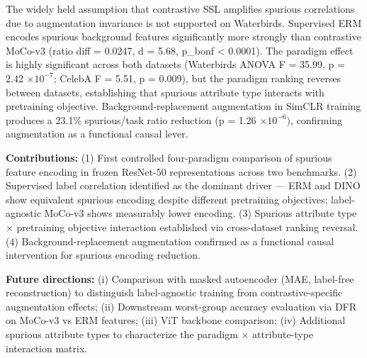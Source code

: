
The widely held assumption that contrastive SSL amplifies spurious correlations due to augmentation invariance is not supported on Waterbirds. Supervised ERM encodes spurious background features significantly more strongly than contrastive MoCo-v3 (ratio diff = 0.0247, d = 5.68, p\_bonf < 0.0001). The paradigm effect is highly significant across both datasets (Waterbirds ANOVA F = 35.99, p = 2.42 $\times 10^{-7}$; CelebA F = 5.51, p = 0.009), but the paradigm ranking reverses between datasets, establishing that spurious attribute type interacts with pretraining objective. Background-replacement augmentation in SimCLR training produces a 23.1\% spurious/task ratio reduction (p = 1.26 $\times 10^{-6})$, confirming augmentation as a functional causal lever.

\textbf{Contributions:} (1) First controlled four-paradigm comparison of spurious feature encoding in frozen ResNet-50 representations across two benchmarks. (2) Supervised label correlation identified as the dominant driver --- ERM and DINO show equivalent spurious encoding despite different pretraining objectives; label-agnostic MoCo-v3 shows measurably lower encoding. (3) Spurious attribute type $\times$ pretraining objective interaction established via cross-dataset ranking reversal. (4) Background-replacement augmentation confirmed as a functional causal intervention for spurious encoding reduction.

\textbf{Future directions:} (i) Comparison with masked autoencoder (MAE, label-free reconstruction) to distinguish label-agnostic training from contrastive-specific augmentation effects; (ii) Downstream worst-group accuracy evaluation via DFR on MoCo-v3 vs ERM features; (iii) ViT backbone comparison; (iv) Additional spurious attribute types to characterize the paradigm $\times$ attribute-type interaction matrix.

